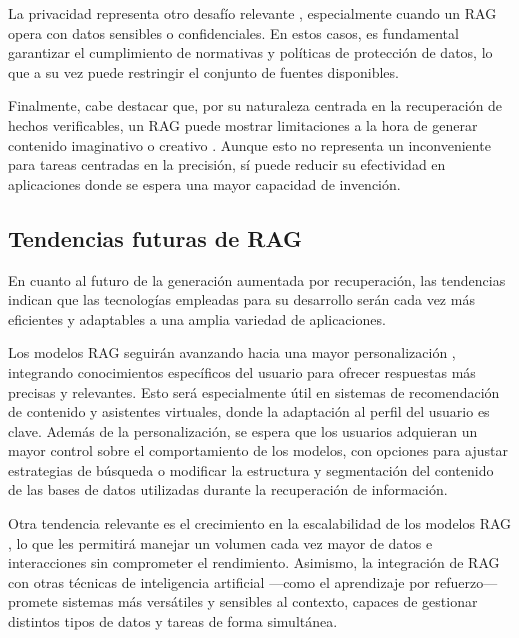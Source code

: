             \noindent La privacidad representa otro desafío relevante \cite{0003_RAGhowitwork2}, especialmente cuando un RAG opera con datos sensibles o confidenciales. En estos casos, es fundamental garantizar el cumplimiento de normativas y políticas de protección de datos, lo que a su vez puede restringir el conjunto de fuentes disponibles.
                    
            \noindent Finalmente, cabe destacar que, por su naturaleza centrada en la recuperación de hechos verificables, un RAG puede mostrar limitaciones a la hora de generar contenido imaginativo o creativo \cite{0003_RAGhowitwork2}. Aunque esto no representa un inconveniente para tareas centradas en la precisión, sí puede reducir su efectividad en aplicaciones donde se espera una mayor capacidad de invención.
        
        \subsection{Tendencias futuras de RAG}
    
            En cuanto al futuro de la generación aumentada por recuperación, las tendencias indican que las tecnologías empleadas para su desarrollo serán cada vez más eficientes y adaptables a una amplia variedad de aplicaciones.
            
            \noindent Los modelos RAG seguirán avanzando hacia una mayor personalización \cite{0003_RAGhowitwork2}, integrando conocimientos específicos del usuario para ofrecer respuestas más precisas y relevantes. Esto será especialmente útil en sistemas de recomendación de contenido y asistentes virtuales, donde la adaptación al perfil del usuario es clave. Además de la personalización, se espera que los usuarios adquieran un mayor control sobre el comportamiento de los modelos, con opciones para ajustar estrategias de búsqueda o modificar la estructura y segmentación del contenido de las bases de datos utilizadas durante la recuperación de información.
            
            \noindent Otra tendencia relevante es el crecimiento en la escalabilidad de los modelos RAG \cite{0003_RAGhowitwork2}, lo que les permitirá manejar un volumen cada vez mayor de datos e interacciones sin comprometer el rendimiento. Asimismo, la integración de RAG con otras técnicas de inteligencia artificial —como el aprendizaje por refuerzo— promete sistemas más versátiles y sensibles al contexto, capaces de gestionar distintos tipos de datos y tareas de forma simultánea.
            
